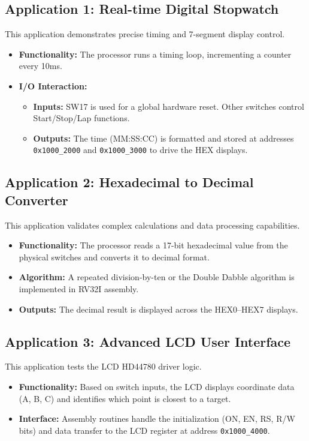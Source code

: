 \subsection{Application 1: Real-time Digital Stopwatch}
This application demonstrates precise timing and 7-segment display control.
\begin{itemize}
	\item \textbf{Functionality:} The processor runs a timing loop, incrementing a counter every 10ms.
	\item \textbf{I/O Interaction:}
	\begin{itemize}
		\item \textbf{Inputs:} SW17 is used for a global hardware reset. Other switches control Start/Stop/Lap functions.
		\item \textbf{Outputs:} The time (MM:SS:CC) is formatted and stored at addresses \texttt{0x1000\_2000} and \texttt{0x1000\_3000} to drive the HEX displays.
	\end{itemize}
\end{itemize}

\subsection{Application 2: Hexadecimal to Decimal Converter}
This application validates complex calculations and data processing capabilities.
\begin{itemize}
	\item \textbf{Functionality:} The processor reads a 17-bit hexadecimal value from the physical switches and converts it to decimal format.
	\item \textbf{Algorithm:} A repeated division-by-ten or the Double Dabble algorithm is implemented in RV32I assembly.
	\item \textbf{Outputs:} The decimal result is displayed across the HEX0--HEX7 displays.
\end{itemize}

\subsection{Application 3: Advanced LCD User Interface}
This application tests the LCD HD44780 driver logic.
\begin{itemize}
	\item \textbf{Functionality:} Based on switch inputs, the LCD displays coordinate data (A, B, C) and identifies which point is closest to a target.
	\item \textbf{Interface:} Assembly routines handle the initialization (ON, EN, RS, R/W bits) and data transfer to the LCD register at address \texttt{0x1000\_4000}.
\end{itemize}

